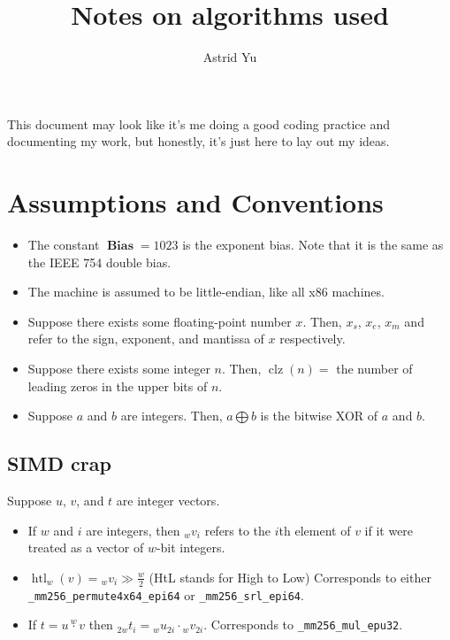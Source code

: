 \documentclass[12pt]{article}
\title{Notes on algorithms used}
\author{Astrid Yu}
\DeclareMathOperator{\bias}{\textbf{Bias}}
\DeclareMathOperator{\htl}{htl}
\DeclareMathOperator{\clz}{clz}
\begin{document}
    \maketitle
    \tableofcontents

    This document may look like it's me doing a good coding practice and documenting my work, but honestly, it's just here to lay out my ideas.

    \section{Assumptions and Conventions}\label{sec:assumptions}

    \begin{itemize}
        \item The constant $\bias = 1023$ is the exponent bias.
        Note that it is the same as the IEEE 754 double bias.
        \item The machine is assumed to be little-endian, like all x86 machines.
        \item Suppose there exists some floating-point number $x$.
        Then, $x_s$, $x_e$, $x_m$ and refer to the sign, exponent, and mantissa of $x$ respectively.
        \item Suppose there exists some integer $n$.
        Then, $\clz(n) =$ the number of leading zeros in the upper bits of $n$.
        \item Suppose $a$ and $b$ are integers.
        Then, $a \bigoplus b$ is the bitwise XOR of $a$ and $b$.
    \end{itemize}

    \subsection{SIMD crap}\label{subsec:simd-assumptions}
    Suppose $u$, $v$, and $t$ are integer vectors.

    \begin{itemize}
        \item If $w$ and $i$ are integers, then ${}_w v_i$ refers to the $i$th element of $v$ if it were treated as a vector of $w$-bit integers.
        \item $\htl_w(v) = {}_w v_i \gg \frac{w}{2}$ (HtL stands for High to Low)
        Corresponds to either \texttt{\_mm256\_permute4x64\_epi64} or \texttt{\_mm256\_srl\_epi64}.
        \item If $t = u \stackrel{w}{\cdot} v$ then ${}_{2w} t_{i} = {}_w u_{2i} \cdot {}_w v_{2i}$.
        Corresponds to \texttt{\_mm256\_mul\_epu32}.
    \end{itemize}
\end{document}
